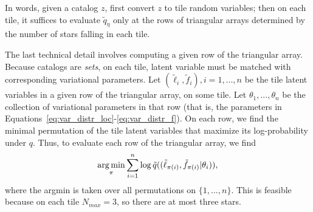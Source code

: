In words, given a catalog $z$,
first convert $z$ to tile random variables;
then on each tile, it suffices to evaluate $\tilde q_\eta$ only at the rows of triangular 
arrays determined by the number 
of stars falling in each tile. 

The last technical detail involves computing 
a given row of the triangular array. 
Because catalogs are {\itshape sets}, on each tile, 
latent variable must 
be matched with corresponding variational parameters. 
Let $(\tilde \ell_i, \tilde f_i), i = 1, ..., n$ be the tile latent variables in a given row of the triangular array, on some tile. 
Let $\theta_1, ..., \theta_n$ be the collection of variational parameters in that row (that is, the parameters in Equations~\ref{eq:var_distr_loc}-\ref{eq:var_distr_f}). 
On each row, we find the minimal permutation of the tile latent variables that maximize its log-probability under $q$. 
Thus, to evaluate each row of the triangular array, we find
\begin{align}
    \operatorname*{arg\,min}_\pi \sum_{i=1}^n \log \tilde q((\tilde \ell_{\pi(i)}, \tilde f_{\pi(i)} | \theta_i)), 
\end{align}
where the argmin is taken over all permutations on $\{1, ..., n\}$. This is feasible because on each tile $N_{max} = 3$, so there are at most three stars. 
